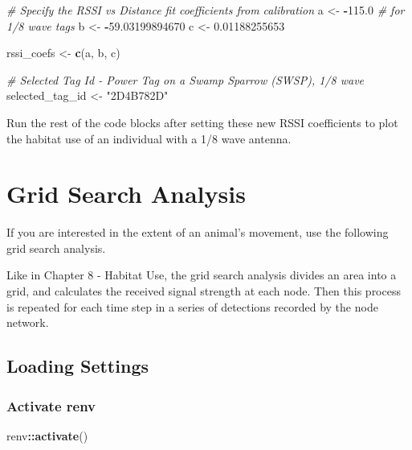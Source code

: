 \documentclass[
]{book}
\newenvironment{Shaded}{\begin{snugshade}}{\end{snugshade}}
\newcommand{\CommentTok}[1]{\textcolor[rgb]{0.56,0.35,0.01}{\textit{#1}}}
\newcommand{\FloatTok}[1]{\textcolor[rgb]{0.00,0.00,0.81}{#1}}
\newcommand{\FunctionTok}[1]{\textcolor[rgb]{0.13,0.29,0.53}{\textbf{#1}}}
\newcommand{\NormalTok}[1]{#1}
\newcommand{\OtherTok}[1]{\textcolor[rgb]{0.56,0.35,0.01}{#1}}
\newcommand{\SpecialCharTok}[1]{\textcolor[rgb]{0.81,0.36,0.00}{\textbf{#1}}}
\newcommand{\StringTok}[1]{\textcolor[rgb]{0.31,0.60,0.02}{#1}}
\begin{document}
\begin{Shaded}
\begin{Highlighting}[]
\CommentTok{\# Specify the RSSI vs Distance fit coefficients from calibration}
\NormalTok{a }\OtherTok{\textless{}{-}} \SpecialCharTok{{-}}\FloatTok{115.0} \CommentTok{\# for 1/8 wave tags}
\NormalTok{b }\OtherTok{\textless{}{-}} \SpecialCharTok{{-}}\FloatTok{59.03199894670}
\NormalTok{c }\OtherTok{\textless{}{-}} \FloatTok{0.01188255653}

\NormalTok{rssi\_coefs }\OtherTok{\textless{}{-}} \FunctionTok{c}\NormalTok{(a, b, c)}

\CommentTok{\# Selected Tag Id {-} Power Tag on a Swamp Sparrow (SWSP), 1/8 wave}
\NormalTok{selected\_tag\_id }\OtherTok{\textless{}{-}} \StringTok{"2D4B782D"}
\end{Highlighting}
\end{Shaded}

Run the rest of the code blocks after setting these new RSSI coefficients to plot the habitat use of an individual with a 1/8 wave antenna.

\chapter{Grid Search Analysis}\label{grid-search-analysis}

If you are interested in the extent of an animal's movement, use the following grid search analysis.

Like in Chapter 8 - Habitat Use, the grid search analysis divides an area into a grid, and calculates the received signal strength at each node. Then this process is repeated for each time step in a series of detections recorded by the node network.

\section{Loading Settings}\label{loading-settings}

\subsection{Activate renv}\label{activate-renv-1}

\begin{Shaded}
\begin{Highlighting}[]
\NormalTok{renv}\SpecialCharTok{::}\FunctionTok{activate}\NormalTok{()}
\end{Highlighting}
\end{Shaded}
\end{document}
